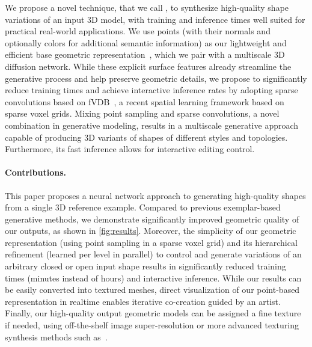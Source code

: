We propose a novel technique, that we call \ourmethod, to synthesize high-quality shape variations of an input 3D model, with training and inference times well suited for practical real-world applications. We use points (with their normals and optionally colors for additional semantic information) as our lightweight and efficient base geometric representation~\cite{prokudin_dynamic_2023}, which we pair with a multiscale 3D diffusion network. While these explicit surface features already streamline the generative process and help preserve geometric details, we propose to significantly reduce training times and achieve interactive inference rates by adopting sparse convolutions based on fVDB~\cite{williams2024fvdb}, a recent spatial learning framework based on sparse voxel grids.
Mixing point sampling and sparse convolutions, a novel combination in generative modeling, results in a multiscale generative approach capable of producing 3D variants of shapes of different styles and topologies. Furthermore, its fast inference allows for interactive editing control.

\vspace*{-5mm}
\paragraph{Contributions.} This paper proposes a neural network approach to generating high-quality shapes from a single 3D reference example. Compared to previous exemplar-based generative methods, we demonstrate significantly improved geometric quality of our outputs, as shown in \cref{fig:results}. Moreover, the simplicity of our geometric representation (using point sampling in a sparse voxel grid) and its hierarchical refinement (learned per level in parallel) to control and generate variations of an arbitrary closed or open input shape results in significantly reduced training times (minutes instead of hours) and interactive inference. While our results can be easily converted into textured meshes, %
direct visualization of our point-based representation in realtime enables iterative co-creation guided by an artist. Finally, our high-quality output geometric models can be assigned a fine texture if needed, using off-the-shelf image super-resolution or more advanced texturing synthesis methods such as~\cite{richardson2023texture}. \vspace*{-1.5mm}


